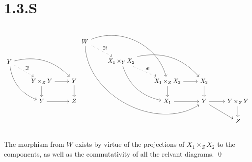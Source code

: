 \documentclass{article}
\begin{document}
\section{1.3.S}
\[
    \begin{tikzcd}
        Y \ar[rdd, bend right] \ar[rrd, bend left] \ar[rd, "\exists!", dotted] &                            &          \\
                                                                               & Y \times_Z Y \ar[d] \ar[r] & Y \ar[d] \\
                                                                               & Y \ar[r]                   & Z
    \end{tikzcd}
    \begin{tikzcd}
        W \arrow[rrrddd, bend right=60] \arrow[rrdd, bend left=49] \arrow[rd, "\exists!", dotted] &                                                                                                &                                      &                        &                       \\
                                                                                                  & X_1 \times_Y X_2 \arrow[rdd, bend right] \arrow[rrd, bend left] \arrow[rd, "\exists!", dotted] &                                      &                        &                       \\
                                                                                                  &                                                                                                & X_1 \times_Z X_2 \arrow[r] \arrow[d] & X_2 \arrow[d]          &                       \\
                                                                                                  &                                                                                                & X_1 \arrow[r]                        & Y \arrow[rd] \arrow[r] & Y\times_Z Y \arrow[d] \\
                                                                                                  &                                                                                                &                                      &                        & Z
    \end{tikzcd}
\]

The morphism from $W$ exists by virtue of the projections of
$X_1 \times_Z X_2$ to the components, as well as the commutativity of all
the relvant diagrams. \qed
\end{document}
